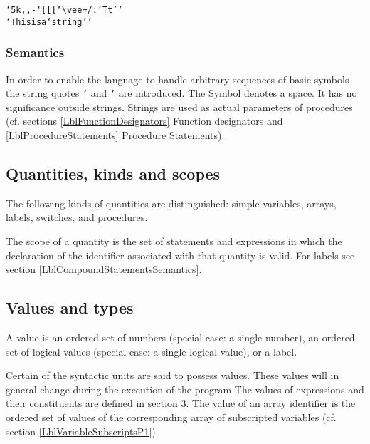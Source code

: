 \documentclass[a4paper,11pt]{article}
\begin{document}
\begin{flushleft}
\texttt{`5k,,-`[[[`$\vee$=/:'Tt''\\
`This\blankchar{}is\blankchar{}a\blankchar{}`string''\\
}\end{flushleft}

\subsubsection{Semantics}
\label{LblBasicSymbolsStringsSemantics}

In order to enable the language to handle arbitrary sequences of basic
symbols the string quotes \texttt{`} and \texttt{'} are introduced.
The Symbol \blankchar denotes a space. It has no significance outside
strings.  Strings are used as actual parameters of procedures
(cf. sections \ref{LblFunctionDesignators} Function designators and
\ref{LblProcedureStatements} Procedure Statements).


\subsection{Quantities, kinds and scopes}
\label{LblQuantitiesKindsAndScopes}



The following kinds of quantities are distinguished: simple variables,
arrays, labels, switches, and procedures.

The scope of a quantity is the set of statements and expressions in
which the declaration of the identifier associated with that quantity
is valid.  For labels see section \ref{LblCompoundStatementsSemantics}.



\subsection{Values and types}
\label{LblValuesAndTypes}

A value is an ordered set of numbers (special case: a single number),
an ordered set of logical values (special case: a single logical
value), or a label.

Certain of the syntactic units are said to possess values.  These
values will in general change during the execution of the program The
values of expressions and their constituents are defined in section 3.
The value of an array identifier is the ordered set of values of the
corresponding array of subscripted variables (cf. section
\ref{LblVariableSubscriptsP1}).
\end{document}
